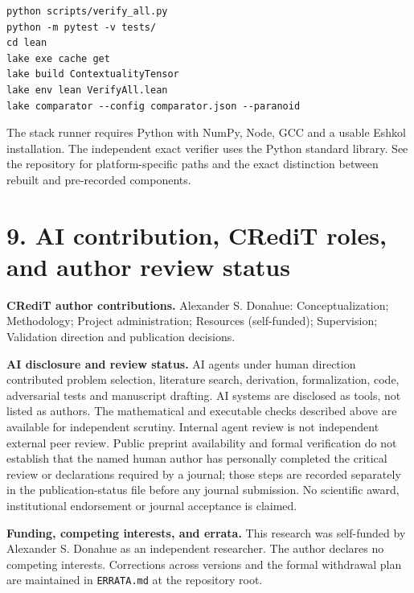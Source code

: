 \documentclass[10pt,a4paper]{article}
\begin{document}
\begin{verbatim}
python scripts/verify_all.py
python -m pytest -v tests/
cd lean
lake exe cache get
lake build ContextualityTensor
lake env lean VerifyAll.lean
lake comparator --config comparator.json --paranoid
\end{verbatim}

The stack runner requires Python with NumPy, Node, GCC and a usable Eshkol installation. The independent exact verifier uses the Python standard library. See the repository for platform-specific paths and the exact distinction between rebuilt and pre-recorded components.

\section{9. AI contribution, CRediT roles, and author review status}\label{ai-contribution-and-author-review-status}

\textbf{CRediT author contributions.} Alexander S. Donahue: Conceptualization; Methodology; Project administration; Resources (self-funded); Supervision; Validation direction and publication decisions.

\textbf{AI disclosure and review status.} AI agents under human direction contributed problem selection, literature search, derivation, formalization, code, adversarial tests and manuscript drafting. AI systems are disclosed as tools, not listed as authors. The mathematical and executable checks described above are available for independent scrutiny. Internal agent review is not independent external peer review. Public preprint availability and formal verification do not establish that the named human author has personally completed the critical review or declarations required by a journal; those steps are recorded separately in the publication-status file before any journal submission. No scientific award, institutional endorsement or journal acceptance is claimed.

\textbf{Funding, competing interests, and errata.} This research was self-funded by Alexander S. Donahue as an independent researcher. The author declares no competing interests. Corrections across versions and the formal withdrawal plan are maintained in \texttt{ERRATA.md} at the repository root.
\end{document}
